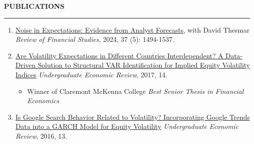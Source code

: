 \documentclass[a4paper, 10pt]{article}
\newcounter{mycounter}
\newcommand{\cvsec}[1]
{
	\needspace{2\baselineskip}
	\noindent \textbf{#1}
	
	\vspace{2pt}
	
	\hrule
	
	\bigskip
}
\newcommand{\cvwip}[1]
{
\item #1 
}
\newenvironment{cvcontinue}[1]
{
	\cvsec{#1}
	\begin{enumerate}
		\setcounter{enumi}{\themycounter}
	}
	{
	\setcounter{mycounter}{\theenumi}
	\end{enumerate}
}
\begin{document}
\begin{cvcontinue}{PUBLICATIONS}
	\item \href{https://www.timdesilva.me/files/papers/noise_expectations.pdf}{Noise in Expectations: Evidence from Analyst Forecasts}, with David Thesmar \newline \emph{Review of Financial Studies}, 2024, 37 (5): 1494-1537.%
	\item \href{https://digitalcommons.iwu.edu/uer/vol14/iss1/8/}{Are Volatility Expectations in Different Countries Interdependent? A Data-Driven Solution to Structural VAR Identification for Implied Equity Volatility Indices} \newline \emph{Undergraduate Economic Review}, 2017, 14.
	\begin{itemize}
		\item Winner of Claremont McKenna College \emph{Best Senior Thesis in Financial Economics}
	\end{itemize}
	\item \href{https://digitalcommons.iwu.edu/uer/vol13/iss1/13/}{Is Google Search Behavior Related to Volatility? Incorporating Google Trends Data into a GARCH Model for Equity Volatility} \newline \emph{Undergraduate Economic Review}, 2016, 13.\\
\end{cvcontinue}

\end{document}
